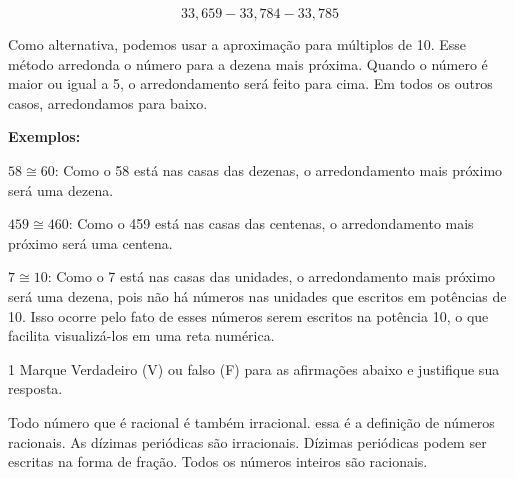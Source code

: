 $$33,659  - 33,784  - 33,785$$

Como alternativa, podemos usar a aproximação para múltiplos de 10. Esse
método arredonda o número para a dezena mais próxima. Quando o número é
maior ou igual a 5, o arredondamento será feito para cima. Em todos os
outros casos, arredondamos para baixo.

\textbf{Exemplos:}

$58\cong 60$: Como o 58 está nas casas das dezenas, o
arredondamento mais próximo será uma dezena.

$459\cong 460$: Como o 459 está nas casas das centenas, o
arredondamento mais próximo será uma centena.

$7\cong 10$: Como o 7 está nas casas das unidades, o
arredondamento mais próximo será uma dezena, pois não há números nas
unidades que escritos em potências de 10. Isso ocorre pelo fato de esses
números serem escritos na potência 10, o que facilita visualizá-los em
uma reta numérica.


\num{1} Marque Verdadeiro (V) ou falso (F) para as afirmações abaixo e
justifique sua resposta.


\begin{boxlist}
 Todo número que é racional é também irracional.
essa é a definição de números racionais.
 As dízimas periódicas são irracionais.
 Dízimas periódicas podem ser escritas na forma de fração.
 Todos os números inteiros são racionais.~

\end{boxlist}


